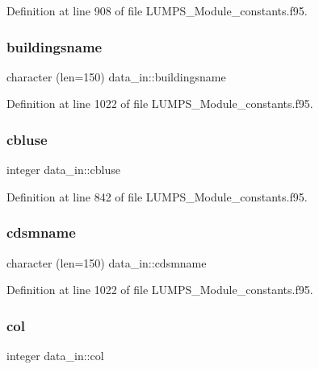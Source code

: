 Definition at line 908 of file L\+U\+M\+P\+S\+\_\+\+Module\+\_\+constants.\+f95.

\mbox{\label{namespacedata__in_ab3871d34bee8f498572c4fae8900e97e}} 
\subsubsection{\texorpdfstring{buildingsname}{buildingsname}}
{\footnotesize\ttfamily character (len=150) data\+\_\+in\+::buildingsname}



Definition at line 1022 of file L\+U\+M\+P\+S\+\_\+\+Module\+\_\+constants.\+f95.

\mbox{\label{namespacedata__in_a0baf7befb79fdeb3a9b4a5107f64d25c}} 
\subsubsection{\texorpdfstring{cbluse}{cbluse}}
{\footnotesize\ttfamily integer data\+\_\+in\+::cbluse}



Definition at line 842 of file L\+U\+M\+P\+S\+\_\+\+Module\+\_\+constants.\+f95.

\mbox{\label{namespacedata__in_adbc74fe8df00866071b1a4717dcd596c}} 
\subsubsection{\texorpdfstring{cdsmname}{cdsmname}}
{\footnotesize\ttfamily character (len=150) data\+\_\+in\+::cdsmname}



Definition at line 1022 of file L\+U\+M\+P\+S\+\_\+\+Module\+\_\+constants.\+f95.

\mbox{\label{namespacedata__in_a14362e5d9e2032601b72e6b50e7a338c}} 
\subsubsection{\texorpdfstring{col}{col}}
{\footnotesize\ttfamily integer data\+\_\+in\+::col}



